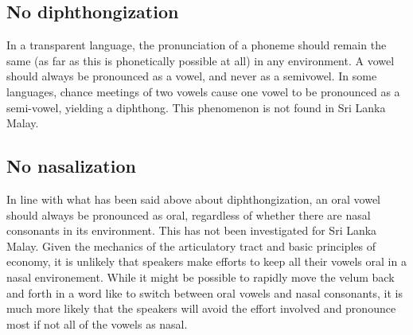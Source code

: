\documentclass[a4paper]{article}
\begin{document}
\subsection{No diphthongization}
In a transparent language, the pronunciation of a phoneme should remain the same (as far as this is phonetically possible at all) in any environment. A vowel should always be pronounced as a vowel, and never as a semivowel. In some languages, chance meetings of two vowels cause one vowel to be pronounced as a semi-vowel, yielding a diphthong. This phenomenon is not found in Sri Lanka Malay.

\subsection{No nasalization}
In line with what has been said above about diphthongization, an oral vowel should always be pronounced as oral, regardless of whether there are nasal consonants in its environment. This has not been investigated for Sri Lanka Malay. Given the mechanics of the articulatory tract and basic principles of economy, it is unlikely that speakers make efforts to keep all their vowels oral in a nasal environement. While it might be possible to rapidly move the velum back and forth in a word like  to switch between oral vowels and nasal consonants, it is much more likely that the speakers will avoid the effort involved and pronounce most if not all of the vowels as nasal.




\end{document}
